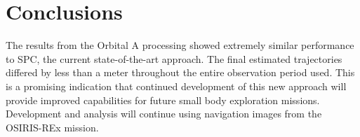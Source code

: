 \documentclass{src/RPI-SIW}
\begin{document}
\section*{Conclusions}
The results from the Orbital A processing showed extremely similar performance to SPC, the current state-of-the-art approach.  The final estimated trajectories differed by less than a meter throughout the entire observation period used.  This is a promising indication that continued development of this new approach will provide improved capabilities for future small body exploration missions.  Development and analysis will continue using navigation images from the OSIRIS-REx mission.

\vspace{3pt}

\titleformat{\section}[runin]{\normalsize\bfseries}{\thesection}{0em}{\addperiod}
{\footnotesize }
\end{document}
